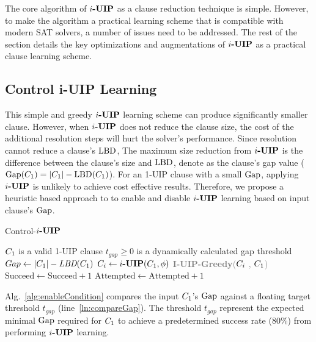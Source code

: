 \documentclass[runningheads]{llncs}
\begin{document}
The core algorithm of $\textbf{$i$-UIP}$ as a clause reduction technique is
simple. However, to make the algorithm a practical learning scheme
that is compatible with modern SAT solvers, a number of issues need to
be addressed. The rest of the section details the key optimizations
and augmentations of $\textbf{$i$-UIP}$ as a practical clause learning scheme.

\subsection{Control i-UIP Learning}
This simple and greedy $\textbf{$i$-UIP}$ learning scheme can produce
significantly smaller clause. However, when $\textbf{$i$-UIP}$ does not reduce
the clause size, the cost of the additional resolution steps will hurt
the solver's performance. Since resolution cannot reduce a clause's
$\text{LBD}$, The maximum size reduction from $\textbf{$i$-UIP}$ is the difference
between the clause's size and $\text{LBD}$, denote as the clause's gap value
($\text{Gap}(C_{1}) = |C_{1}| - \text{LBD}(C_{1})$). For
an 1-UIP clause with a small $\text{Gap}$, applying $\textbf{$i$-UIP}$ is unlikely to
achieve cost effective results. Therefore, we propose a heuristic
based approach to to enable and disable $\textbf{$i$-UIP}$ learning based on
input clause's $\text{Gap}$.

\begin{algorithm}[t]
\caption{Control-$\textbf{$i$-UIP}$}\label{alg:enableCondition}
\begin{algorithmic}[1]
\Require  $C_{1}$ is a valid 1-UIP clause
\Require  $ t_{gap} \ge 0$ is a dynamically calculated gap threshold
    \State $Gap \gets |C_{1}| - \textit{LBD}(C_{1})$
      \label{ln:compareGap}
        \State $C_{i} \gets \textbf{$i$-UIP}(C_{1}, \phi)$
        \State \textcolor{gray}{\textbf{I-UIP-Greedy}($C_{i}$ , $C_{1}$)}
        \If {$|\iUIPClause| < |\oneUIPClause|$} 
            \State $\text{Succeed} \gets \text{Succeed}+1$ \label{ln:updateS}
        \EndIf
        \State $\text{Attempted} \gets \text{Attempted}+1$ \label{ln:updateA}
     \EndIf
\EndProcedure
\end{algorithmic}
\end{algorithm}

Alg.~\ref{alg:enableCondition} compares the input $C_{1}$'s
$\text{Gap}$ against a floating target threshold $t_{gap}$
(line~\ref{ln:compareGap}). The threshold $t_{gap}$ represent the
expected minimal $\text{Gap}$ required for $C_{1}$ to achieve a
predetermined success rate (80\%) from performing $\textbf{$i$-UIP}$ learning.
\end{document}

